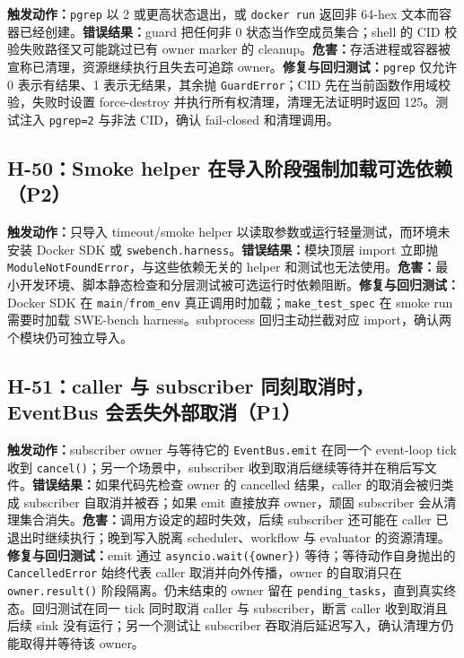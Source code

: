 \documentclass[11pt,a4paper,fontset=fandol]{ctexart}
\newcommand{\code}[1]{\texttt{#1}}
\begin{document}
\textbf{触发动作：}\code{pgrep} 以 2 或更高状态退出，或 \code{docker run} 返回非 64-hex 文本而容器已经创建。\textbf{错误结果：}guard 把任何非 0 状态当作空成员集合；shell 的 CID 校验失败路径又可能跳过已有 owner marker 的 cleanup。\textbf{危害：}存活进程或容器被宣称已清理，资源继续执行且失去可追踪 owner。\textbf{修复与回归测试：}\code{pgrep} 仅允许 0 表示有结果、1 表示无结果，其余抛 \code{GuardError}；CID 先在当前函数作用域校验，失败时设置 force-destroy 并执行所有权清理，清理无法证明时返回 125。测试注入 \code{pgrep=2} 与非法 CID，确认 fail-closed 和清理调用。

\subsection{H-50：Smoke helper 在导入阶段强制加载可选依赖（P2）}

\textbf{触发动作：}只导入 timeout/smoke helper 以读取参数或运行轻量测试，而环境未安装 Docker SDK 或 \code{swebench.harness}。\textbf{错误结果：}模块顶层 import 立即抛 \code{ModuleNotFoundError}，与这些依赖无关的 helper 和测试也无法使用。\textbf{危害：}最小开发环境、脚本静态检查和分层测试被可选运行时依赖阻断。\textbf{修复与回归测试：}Docker SDK 在 \code{main}/\code{from\_env} 真正调用时加载；\code{make\_test\_spec} 在 smoke run 需要时加载 SWE-bench harness。subprocess 回归主动拦截对应 import，确认两个模块仍可独立导入。

\subsection{H-51：caller 与 subscriber 同刻取消时，EventBus 会丢失外部取消（P1）}

\textbf{触发动作：}subscriber owner 与等待它的 \code{EventBus.emit} 在同一个 event-loop tick 收到 \code{cancel()}；另一个场景中，subscriber 收到取消后继续等待并在稍后写文件。\textbf{错误结果：}如果代码先检查 owner 的 cancelled 结果，caller 的取消会被归类成 subscriber 自取消并被吞；如果 emit 直接放弃 owner，顽固 subscriber 会从清理集合消失。\textbf{危害：}调用方设定的超时失效，后续 subscriber 还可能在 caller 已退出时继续执行；晚到写入脱离 scheduler、workflow 与 evaluator 的资源清理。\textbf{修复与回归测试：}emit 通过 \code{asyncio.wait(\{owner\})} 等待；等待动作自身抛出的 \code{CancelledError} 始终代表 caller 取消并向外传播，owner 的自取消只在 \code{owner.result()} 阶段隔离。仍未结束的 owner 留在 \code{pending\_tasks}，直到真实终态。回归测试在同一 tick 同时取消 caller 与 subscriber，断言 caller 收到取消且后续 sink 没有运行；另一个测试让 subscriber 吞取消后延迟写入，确认清理方仍能取得并等待该 owner。
\end{document}
